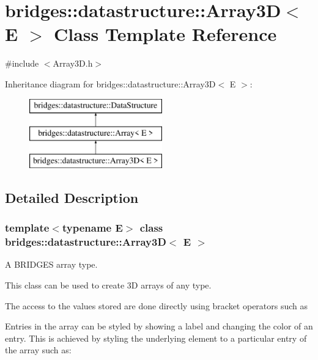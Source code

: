 \hypertarget{classbridges_1_1datastructure_1_1_array3_d}{}\section{bridges\+::datastructure\+::Array3D$<$ E $>$ Class Template Reference}
\label{classbridges_1_1datastructure_1_1_array3_d}


{\ttfamily \#include $<$Array3\+D.\+h$>$}

Inheritance diagram for bridges\+::datastructure\+::Array3D$<$ E $>$\+:\begin{figure}[H]
\begin{center}
\leavevmode
\includegraphics[height=3.000000cm]{classbridges_1_1datastructure_1_1_array3_d}
\end{center}
\end{figure}


\subsection{Detailed Description}
\subsubsection*{template$<$typename E$>$\newline
class bridges\+::datastructure\+::\+Array3\+D$<$ E $>$}

A B\+R\+I\+D\+G\+ES array type. 

This class can be used to create 3D arrays of any type.

The access to the values stored are done directly using bracket operators such as


\begin{DoxyCode}{0}
\end{DoxyCode}


Entries in the array can be styled by showing a label and changing the color of an entry. This is achieved by styling the underlying element to a particular entry of the array such as\+:


